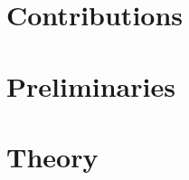 \documentclass{article}
\begin{document}
\subsection{}

\section{Contributions}
\label{sec:headings}




\section{Preliminaries}


\section{Theory}
\end{document}

